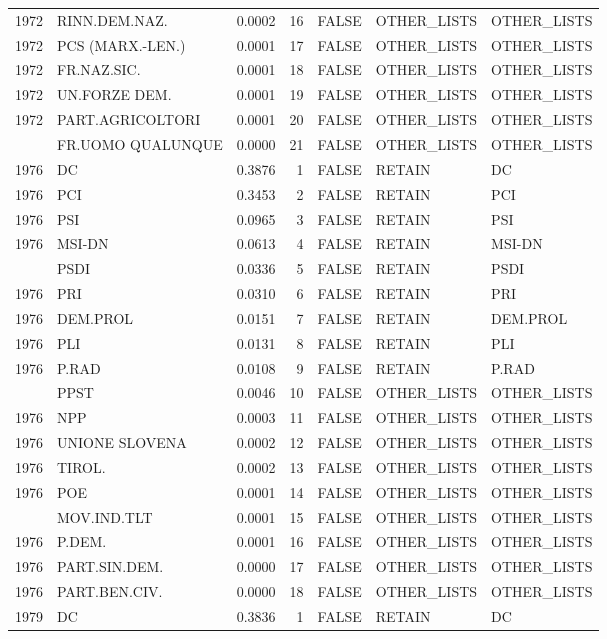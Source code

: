 \begin{longtable}[t]{rlrrlll}
1972 & RINN.DEM.NAZ. & 0.0002 & 16 & FALSE & OTHER\_LISTS & OTHER\_LISTS\\
1972 & PCS (MARX.-LEN.) & 0.0001 & 17 & FALSE & OTHER\_LISTS & OTHER\_LISTS\\
1972 & FR.NAZ.SIC. & 0.0001 & 18 & FALSE & OTHER\_LISTS & OTHER\_LISTS\\
1972 & UN.FORZE DEM. & 0.0001 & 19 & FALSE & OTHER\_LISTS & OTHER\_LISTS\\
1972 & PART.AGRICOLTORI & 0.0001 & 20 & FALSE & OTHER\_LISTS & OTHER\_LISTS\\
\addlinespace
1972 & FR.UOMO QUALUNQUE & 0.0000 & 21 & FALSE & OTHER\_LISTS & OTHER\_LISTS\\
1976 & DC & 0.3876 & 1 & FALSE & RETAIN & DC\\
1976 & PCI & 0.3453 & 2 & FALSE & RETAIN & PCI\\
1976 & PSI & 0.0965 & 3 & FALSE & RETAIN & PSI\\
1976 & MSI-DN & 0.0613 & 4 & FALSE & RETAIN & MSI-DN\\
\addlinespace
1976 & PSDI & 0.0336 & 5 & FALSE & RETAIN & PSDI\\
1976 & PRI & 0.0310 & 6 & FALSE & RETAIN & PRI\\
1976 & DEM.PROL & 0.0151 & 7 & FALSE & RETAIN & DEM.PROL\\
1976 & PLI & 0.0131 & 8 & FALSE & RETAIN & PLI\\
1976 & P.RAD & 0.0108 & 9 & FALSE & RETAIN & P.RAD\\
\addlinespace
1976 & PPST & 0.0046 & 10 & FALSE & OTHER\_LISTS & OTHER\_LISTS\\
1976 & NPP & 0.0003 & 11 & FALSE & OTHER\_LISTS & OTHER\_LISTS\\
1976 & UNIONE SLOVENA & 0.0002 & 12 & FALSE & OTHER\_LISTS & OTHER\_LISTS\\
1976 & TIROL. & 0.0002 & 13 & FALSE & OTHER\_LISTS & OTHER\_LISTS\\
1976 & POE & 0.0001 & 14 & FALSE & OTHER\_LISTS & OTHER\_LISTS\\
\addlinespace
1976 & MOV.IND.TLT & 0.0001 & 15 & FALSE & OTHER\_LISTS & OTHER\_LISTS\\
1976 & P.DEM. & 0.0001 & 16 & FALSE & OTHER\_LISTS & OTHER\_LISTS\\
1976 & PART.SIN.DEM. & 0.0000 & 17 & FALSE & OTHER\_LISTS & OTHER\_LISTS\\
1976 & PART.BEN.CIV. & 0.0000 & 18 & FALSE & OTHER\_LISTS & OTHER\_LISTS\\
1979 & DC & 0.3836 & 1 & FALSE & RETAIN & DC\\

\end{longtable}
